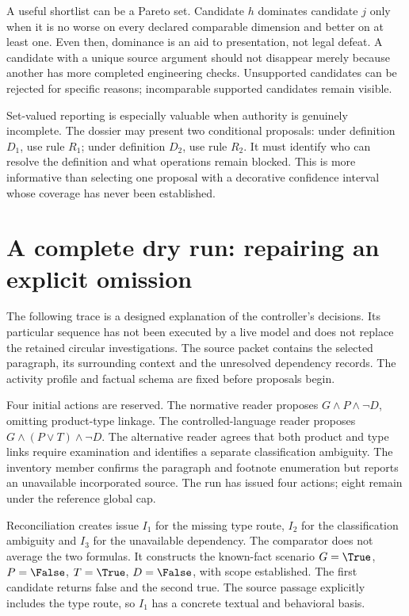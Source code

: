 A useful shortlist can be a Pareto set. Candidate $h$ dominates candidate $j$ only
when it is no worse on every declared comparable dimension and better on at least
one. Even then, dominance is an aid to presentation, not legal defeat. A candidate
with a unique source argument should not disappear merely because another has
more completed engineering checks. Unsupported candidates can be rejected for
specific reasons; incomparable supported candidates remain visible.

Set-valued reporting is especially valuable when authority is genuinely
incomplete. The dossier may present two conditional proposals: under definition
$D_1$, use rule $R_1$; under definition $D_2$, use rule $R_2$. It must identify who
can resolve the definition and what operations remain blocked. This is more
informative than selecting one proposal with a decorative confidence interval
whose coverage has never been established.

\section{A complete dry run: repairing an explicit omission}
\label{merge:M06:20}


The following trace is a designed explanation of the controller's decisions.
Its particular sequence has not been executed by a live model and does not
replace the retained circular investigations. The source packet contains the selected paragraph, its surrounding
context and the unresolved dependency records. The activity profile and factual
schema are fixed before proposals begin.

Four initial actions are reserved. The normative reader proposes
$G\land P\land\neg D$, omitting product-type linkage. The controlled-language
reader proposes $G\land(P\lor T)\land\neg D$. The alternative reader agrees that
both product and type links require examination and identifies a separate
classification ambiguity. The inventory member confirms the paragraph and
footnote enumeration but reports an unavailable incorporated source. The run has
issued four actions; eight remain under the reference global cap.

Reconciliation creates issue $I_1$ for the missing type route, $I_2$ for the
classification ambiguity and $I_3$ for the unavailable dependency. The comparator
does not average the two formulas. It constructs the known-fact scenario
$G=\True$, $P=\False$, $T=\True$, $D=\False$, with scope established. The first
candidate returns false and the second true. The source passage explicitly
includes the type route, so $I_1$ has a concrete textual and behavioral basis.

